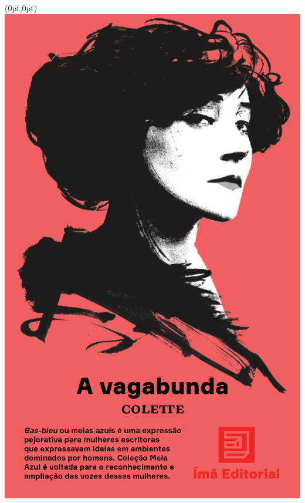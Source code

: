\pagestyle{ima}
\label{ima}

\begin{textblock*}{5.625in}(0pt,0pt)%
\vspace*{-3.2cm}
\hspace*{-1.95cm}\includegraphics*[width=160mm]{./imgs/IMA.png}
\end{textblock*}

\pagebreak %


